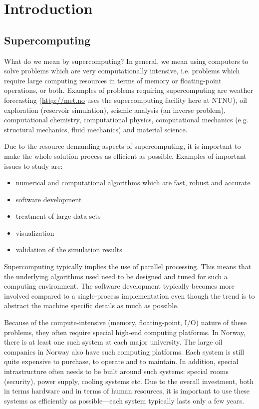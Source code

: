 \chapter{Introduction}

\section{Supercomputing}

What do we mean by supercomputing? In general, we mean using computers to solve
problems which are very computationally intensive, i.e. problems which require
large computing resources in terms of memory or floating-point operations, or
both. Examples of problems requiring supercomputing are weather forecasting
(\url{http://met.no} uses the supercomputing facility here at NTNU), oil
exploration (reservoir simulation), seismic analysis (an inverse problem),
computational chemistry, computational physics, computational mechanics (e.g.
structural mechanics, fluid mechanics) and material science.

Due to the resource demanding aspects of supercomputing, it is important to make
the whole solution process as efficient as possible. Examples of important
issues to study are:
\begin{itemize}
\item numerical and computational algorithms which are fast, robust and accurate
\item software development
\item treatment of large data sets
\item visualization
\item validation of the simulation results
\end{itemize}
Supercomputing typically implies the use of parallel processing. This means that
the underlying algorithms used need to be designed and tuned for such a
computing environment. The software development typically becomes more involved
compared to a single-process implementation even though the trend is to abstract
the machine specific details as much as possible.

Because of the compute-intensive (memory, floating-point, I/O) nature of these
problems, they often require special high-end computing platforms. In Norway,
there is at least one such system at each major university. The large oil
companies in Norway also have such computing platforms. Each system is still
quite expensive to purchase, to operate and to maintain. In addition, special
intrastructure often needs to be built around such systems: special rooms
(security), power supply, cooling systems etc. Due to the overall investment,
both in terms hardware and in terms of human resources, it is important to use
these systems as efficiently as possible---each system typically lasts only a
few years.

